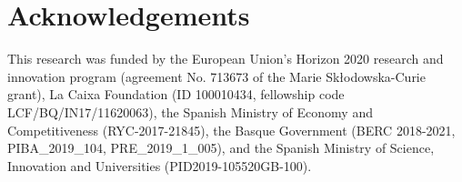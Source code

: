 \documentclass[5p]{elsarticle}
\begin{document}
\section{Acknowledgements}

This research was funded by the European Union’s Horizon 2020 research and innovation program (agreement No. 713673 of the Marie Skłodowska-Curie grant), La Caixa Foundation (ID 100010434, fellowship code LCF/B\linebreak Q/IN17/11620063), the Spanish Ministry of Economy and Competitiveness (RYC-2017-21845), the Basque Government (BERC 2018-2021, PIBA\_2019\_104, PRE\_2019\_1\_005), and the Spanish Ministry of Science, Innovation and Universities (PID2019-105520GB-100).


\end{document}
